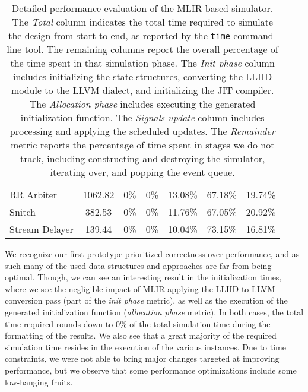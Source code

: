 \begin{table}[ht]
{\begin{tabular}{lcccccc}
      RR Arbiter      & 1062.82            & 0\%                       & 0\%                        & 13.08\%                    & 67.18\%                    & 19.74\%            \\
      Snitch          & 382.53             & 0\%                       & 0\%                        & 11.76\%                    & 67.05\%                    & 20.92\%            \\
      Stream Delayer  & 139.44             & 0\%                       & 0\%                        & 10.04\%                    & 73.15\%                    & 16.81\%            \\
      \bottomrule
    \end{tabular}
  }
  \caption[Detailed performance evaluation of the MLIR-based simulator]{Detailed performance evaluation of the MLIR-based simulator. The \textit{Total} column indicates the total time required to simulate the design from start to end, as reported by the \texttt{time} command-line tool. The remaining columns report the overall percentage of the time spent in that simulation phase. The \textit{Init phase} column includes initializing the state structures, converting the LLHD module to the LLVM dialect, and initializing the JIT compiler. The \textit{Allocation phase} includes executing the generated initialization function. The \textit{Signals update} column includes processing and applying the scheduled updates. The \textit{Remainder} metric reports the percentage of time spent in stages we do not track, including constructing and destroying the simulator, iterating over, and popping the event queue.}
  \label{tab:time_detail0}
\end{table}

We recognize our first prototype prioritized correctness over performance, and as such many of the used data structures and approaches are far from being optimal. Though, we can see an interesting result in the initialization times, where we see the negligible impact of MLIR applying the LLHD-to-LLVM conversion pass (part of the \textit{init phase} metric), as well as the execution of the generated initialization function (\textit{allocation phase} metric). In both cases, the total time required rounds down to $0\%$ of the total simulation time during the formatting of the results. We also see that a great majority of the required simulation time resides in the execution of the various instances. Due to time constraints, we were not able to bring major changes targeted at improving performance, but we observe that some performance optimizations include some low-hanging fruits.

